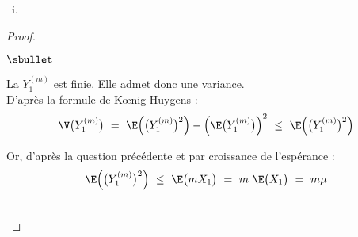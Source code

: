 \begin{liste}{\ i.}
\begin{proof}
\begin{noliste}{$\sbullet$}
    \item La \var $Y_{1}^{(m)}$ est finie. Elle admet donc une
      variance.\\
      D'après la formule de K\oe{}nig-Huygens :
      \[
      \V\big( Y_{1}^{(m)} \big) \ = \ \E\Big(\big( Y_{1}^{(m)} \big)^2
      \Big) - \Big(\E\big( Y_{1}^{(m)} \big) \Big)^2 \ \leq \
      \E\Big(\big( Y_{1}^{(m)} \big)^2 \Big)
      \]
      
    \item Or, d'après la question précédente et par croissance de
      l'espérance : 
      \[
      \E\Big(\big( Y_{1}^{(m)} \big)^2 \Big) \ \leq \ \E\big(m
      X_1\big) \ = \ m \ \E\big(X_1\big) \ = \ m \mu
      \]        
    \end{noliste}
    ~\\[-1cm]
  \end{proof}
\end{liste}

